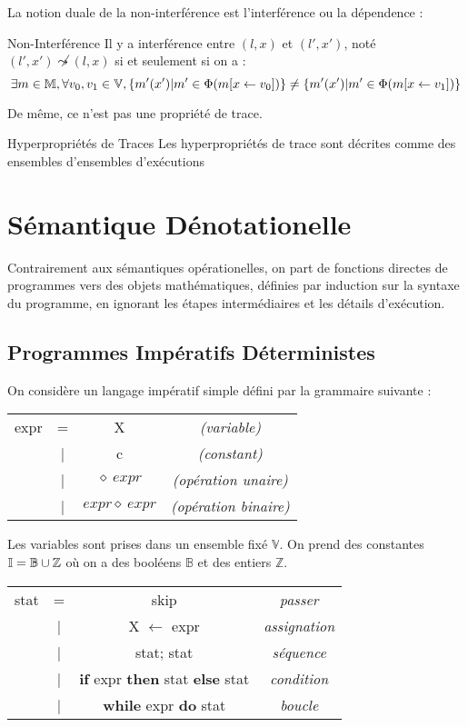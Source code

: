\documentclass{cours}
\begin{document}
La notion duale de la non-interférence est l'interférence ou la dépendence : 
\begin{définition}{Non-Interférence}{}
    Il y a interférence entre $(l, x)$ et $(l', x')$, noté $(l',x') \not\leadsto (l, x)$ si et seulement si on a : 
    \[
        \exists m \in \mathbb{M}, \forall v_{0}, v_{1} \in \mathbb{V}, \left\{m'(x')\middle| m' \in \Phi(m[x \gets v_{0}])\right\} \neq \left\{m'(x')\middle| m'\in \Phi(m[x \gets v_{1}])\right\}
    \]
\end{définition}
De même, ce n'est pas une propriété de trace.

\begin{définition}{Hyperpropriétés de Traces}{}
    Les hyperpropriétés de trace sont décrites comme des ensembles d'ensembles d'exécutions
\end{définition}

\section{Sémantique Dénotationelle}
Contrairement aux sémantiques opérationelles, on part de fonctions directes de programmes vers des objets mathématiques, définies par induction sur la syntaxe du programme, en ignorant les étapes intermédiaires et les détails d'exécution. 

\subsection{Programmes Impératifs Déterministes}
On considère un langage impératif simple défini par la grammaire suivante : 
\begin{center}
    \begin{tabular}{ccc>{\it}c}
        expr & = & X & (variable)\\
        & | & c & (constant)\\
        & | & $\diamond\ expr$ & (opération unaire)\\
        & | & $expr \diamond\ expr$ & (opération binaire)
    \end{tabular}
\end{center}

Les variables sont prises dans un ensemble fixé $\mathbb{V}$. On prend des constantes $\mathbb{I} = \mathbb{B} \cup \mathbb{Z}$ où on a des booléens $\mathbb{B}$ et des entiers $\mathbb{Z}$.\\
\begin{center}
    \begin{tabular}{ccc>{\it}c}
        stat & = & \rm skip & passer\\
        & | & X $\gets$ expr & assignation\\
        & | & stat; stat & séquence\\
        & | & {\bf if} expr {\bf then} stat {\bf else} stat & condition\\
        & | & {\bf while} expr {\bf do} stat & boucle
    \end{tabular}
\end{center}
\end{document}
